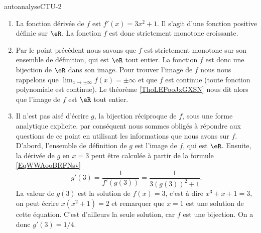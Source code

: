 
\begin{corrige}{autoanalyseCTU-2}


\begin{enumerate}
\item La fonction dérivée de $f$ est  $f'(x) = 3x^2 + 1$. Il s'agit d'une fonction positive définie sur $\eR$. La fonction $f$ est donc strictement monotone croissante. 
\item Par le point précédent nous savons que $f$ est strictement monotone sur son ensemble de définition, qui est $\eR$ tout entier. La fonction $f$ est donc une bijection de $\eR$ dans son image. Pour trouver l'image de $f$ nous nous rappelons que $\lim_{x\to \pm\infty} f(x) = \pm\infty$ et que $f$ est continue (toute fonction polynomiale est continue). Le théorème \ref{ThoLEPooJxGXSN} nous dit alors que l'image de $f$ est $\eR$ tout entier. 
\item Il n'est pas aisé d'écrire $g$, la bijection réciproque de $f$, sous une forme analytique explicite. par conséquent nous sommes obligés à répondre aux questions de ce point en utilisant les informations que nous avons sur $f$. D'abord, l'ensemble de définition de $g$ est l'image de $f$, qui est $\eR$. Ensuite, la dérivée de $g$ en $x=3$ peut \^etre calculée à partir de la formule \eqref{EqWWAooBRFNsv} 
  \begin{equation*}
    g'(3) = \frac{1}{f'(g(3))} = \frac{1}{3(g(3))^2 +1}.
  \end{equation*}
La valeur de $g(3)$ est la solution de $f(x) = 3$, c'est à dire $x^3+x+1 = 3$, on peut écrire $x(x^2+1) = 2$ et remarquer que $x=1$ est une solution de cette équation. C'est d'ailleurs la seule solution, car $f$ est une bijection. On a donc $g'(3) = 1/4$.
\end{enumerate}

\end{corrige}   
